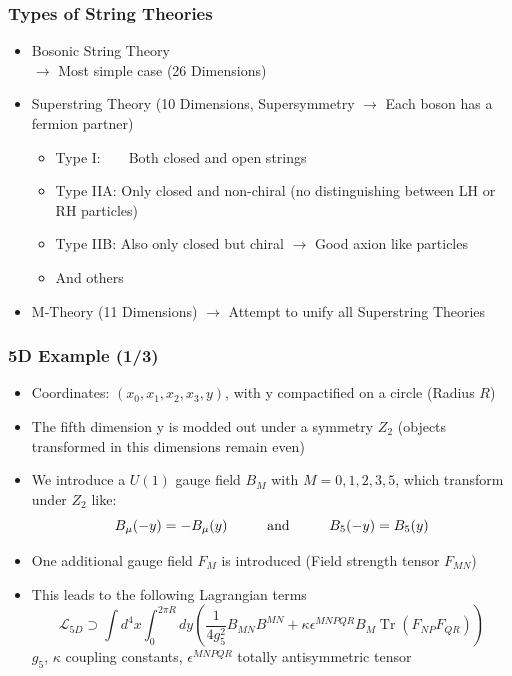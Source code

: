 \documentclass[aspectratio=1610, 9pt]{beamer}
\DeclareMathOperator{\Tr}{Tr}
\begin{document}
\begin{frame}
	\frametitle{Types of String Theories}
		\begin{itemize}
			\item Bosonic String Theory\\
			$\rightarrow$ Most simple case (26 Dimensions) 
			\item Superstring Theory (10 Dimensions, Supersymmetry $\rightarrow$ Each boson has a fermion partner)\\
			\begin{itemize}
				\item[\ ]{\color{tugreen!60!black}Type I:}\ \ \ \ Both closed and open strings
				\item[\ ]{\color{tugreen!60!black}Type IIA:} Only closed and non-chiral (no distinguishing between LH or RH particles)
				\item[\ ]{\color{tugreen!60!black}Type IIB:} Also only closed but chiral $\rightarrow$ Good axion like particles
				\item[\ ]{\color{tugreen!60!black}And others}
			\end{itemize}
			\item M-Theory (11 Dimensions)
			$\rightarrow$ Attempt to unify all Superstring Theories
		\end{itemize}
\end{frame}


\begin{frame}
	\frametitle{5D Example (1/3)}
	
	\begin{itemize}
		\item Coordinates: $(x_0, x_1, x_2, x_3, y)$, with y compactified on a circle (Radius $R$) 
		\item The fifth dimension y is modded out under a symmetry $Z_2$ (objects transformed in this dimensions remain even)
		\item We introduce a $U(1)$ gauge field $B_M$ with $M = 0,1,2,3,5$, which transform under $Z_2$ like:
		\begin{equation*}
			B_{\mu}(-y) = -B_{\mu}(y)\hspace{1 cm}\text{and}\hspace{1cm}  B_5(-y) = B_5(y)
		\end{equation*}	
		\item One additional gauge field $F_M$ is introduced (Field strength tensor $F_{MN}$)
		\item This leads to the following Lagrangian terms
		\begin{equation*}
			\mathcal{L}_{5D} \supset \int d^4x \int_0^{2\pi R} dy \left( \frac{1}{4 g_5^2} B_{MN} B^{MN} + \kappa \epsilon^{MNPQR} B_M \Tr(F_{NP} F_{QR}) \right)
		\end{equation*}
		$g_5$, $\kappa$ coupling constants, $\epsilon^{MNPQR}$ totally antisymmetric tensor
	\end{itemize}
\end{frame}
\end{document}
